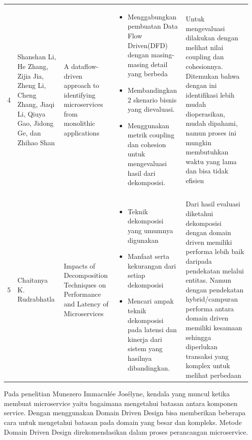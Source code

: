 \begin{small}
\begin{longtable}{|p{0.5cm}|p{2.7cm}|p{2.5cm}|p{3.8cm}|p{2.5cm}|}
		\hline
		4 & Shanshan Li, He Zhang, Zijia Jia, Zheng Li, Cheng Zhang, Jiaqi Li,  Qiuya Gao, Jidong Ge, dan Zhihao Shan
		  & A dataflow-driven approach to identifying microservices from monolithic applications  \cite{10}		  
		  & \begin{itemize}
				\item Menggabungkan pembuatan Data Flow Driven(DFD) dengan masing-masing detail yang berbeda
				\item Membandingkan 2 skenario bisnis yang dievaluasi. 
				\item Menggunakan metrik coupling dan cohesion untuk mengevaluasi hasil dari dekomposisi.
			\end{itemize}
		  & Untuk mengevaluasi dilakukan dengan melihat nilai coupling dan cohesionnya. Ditemukan bahwa dengan ini identifikasi lebih mudah dioperasikan, mudah dipahami, namun proses ini mungkin membutuhkan waktu yang lama dan bisa tidak efisien\\
		\label{tbl:StateoftheArt}\\

		\hline
		5 & Chaitanya K. Rudrabhatla
		  & Impacts of Decomposition Techniques on Performance and Latency of Microservices  \cite{3}
		  & \begin{itemize}
				\item Teknik dekomposisi  yang umumnya digunakan
				\item Manfaat serta kekurangan dari setiap dekomposisi
				\item Mencari ampak teknik dekomposisi pada latensi dan kinerja dari sistem yang hasilnya dibandingkan.
			\end{itemize}
		  & Dari hasil evaluasi diketahui dekomposisi dengan domain driven memiliki performa lebih baik daripada pendekatan melalui entitas. Namun dengan pendekatan hybrid/campuran performa antara domain driven memiliki kesamaan sehingga diperlukan transaksi yang komplex untuk melihat perbedaan\\
		\hline
	\end{longtable}
\end{small}
\endgroup
Pada penelitian Munezero Immaculée Josélyne, kendala yang muncul ketika membuat  microservice yaitu bagaimana mengetahui batasan antara komponen service. Dengan menggunakan Domain Driven Design bisa memberikan beberapa cara untuk mengetahui batasan pada domain yang besar dan kompleks. Metode Domain Driven Design direkomendasikan dalam proses perancangan microservice. \\

